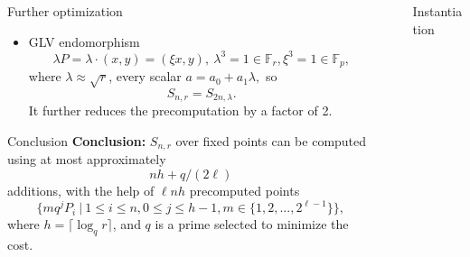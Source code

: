 \documentclass[final]{beamer}
\newlength{\sepwid}
\newlength{\onecolwid}
\begin{document}
\begin{frame}[t]
\begin{columns}[t]
\begin{column}{\onecolwid}
\begin{block}{Further optimization}
\begin{itemize}
 Bucket set can be further reduced to ($|B|\approx q/(2\ell)$)
			\begin{equation*}
			\begin{aligned}
			B=&\{i \mid 0 \leq i \leq 2^{\ell}\} \cup\\
			&\{2^{i \cdot \ell} \bmod q \mid 0 \leq i \leq\lfloor(q-1) / 2 \ell\rfloor\}.
			\end{aligned}
			\end{equation*}
			
		\item GLV endomorphism 
		\[\lambda P = \lambda\cdot (x,y) = (\xi x, y),\  \lambda^3=1\in \mathbb{F}_r, \xi^3=1 \in \mathbb{F}_p,\]			
		where $\lambda \approx \sqrt{r}$, every scalar 
		$a = a_0 + a_1\lambda,$	so			
		\[S_{n,r} = S_{2n,\lambda}.\]	
		It further reduces the precomputation by a factor of 2.
		
	\end{itemize}
\end{block}

\begin{block}{Conclusion}
\small
\textbf{Conclusion:} $S_{n,r}$ over fixed points can be computed using at most approximately
								\begin{equation}
								nh + q/(2\ell)
								\end{equation}
								additions, with the help of $\ell nh$ precomputed points
								\begin{equation*}
								\{mq^jP_i\ |\ 1\le i\le n,0\le j\le h-1,m\in \{1,2,...,2^{\ell-1}\}\},
								\end{equation*}	
			where $h = \lceil \log_q r\rceil$, and $q$ is a prime selected to minimize the cost.
\end{block}



\end{column} %


\begin{column}{\sepwid}\end{column} %

\begin{column}{\onecolwid} 

\begin{block}{Instantiation}
\small


\end{block}
\end{column}
\end{columns}
\end{frame}
\end{document}
